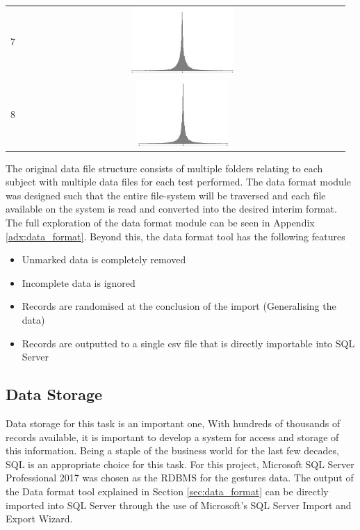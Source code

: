 \documentclass[11pt]{article}
\begin{document}
\begin{table}[H]
\begin{tabular}{cc}
			7 & \includegraphics[height=2.5cm, width=12cm]{Figures/Stats/channel7}\\
			8 & \includegraphics[height=2.5cm, width=12cm]{Figures/Stats/channel8}\\
			\bottomrule
		\end{tabular}
	\end{table}

	\noindent
	The original data file structure consists of multiple folders relating to each subject with multiple data files for each test performed. The data format module was designed such that the entire file-system will be traversed and each file available on the system is read and converted into the desired interim format. The full exploration of the data format module can be seen in Appendix  \ref{adx:data_format}. Beyond this, the data format tool has the following features
	
	\begin{itemize}
		\item Unmarked data is completely removed
		\item Incomplete data is ignored
		\item Records are randomised at the conclusion of the import (Generalising the data)
		\item Records are outputted to a single csv file that is directly importable into SQL Server
	\end{itemize}

	\subsection{Data Storage}
	Data storage for this task is an important one, With hundreds of thousands of records available, it is important to develop a system for access and storage of this information. Being a staple of the business world for the last few decades, SQL is an appropriate choice for this task. For this project, Microsoft SQL Server Professional 2017 was chosen as the RDBMS for the gestures data. The output of the Data format tool explained in Section \ref{sec:data_format} can be directly imported into SQL Server through the use of Microsoft's SQL Server Import and Export Wizard. 
	
\end{document}
